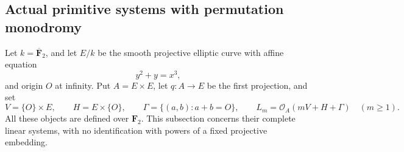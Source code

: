 \subsection{Actual primitive systems with permutation monodromy}

Let \(k=\overline{\mathbf F}_2\), and let \(E/k\) be the smooth
projective elliptic curve with affine equation
\[
                         y^2+y=x^3,
\]
and origin \(O\) at infinity. Put \(A=E\times E\), let
\(q:A\to E\) be the first projection, and set
\[
 V=\{O\}\times E,\qquad H=E\times\{O\},\qquad
 \Gamma=\{(a,b):a+b=O\},\qquad
 L_m=\mathcal O_A(mV+H+\Gamma)\quad(m\ge1).
                                                        \tag{EDC1}
\]
All these objects are defined over \(\mathbf F_2\). This
subsection concerns their complete linear systems, with no
identification with powers of a fixed projective embedding.

